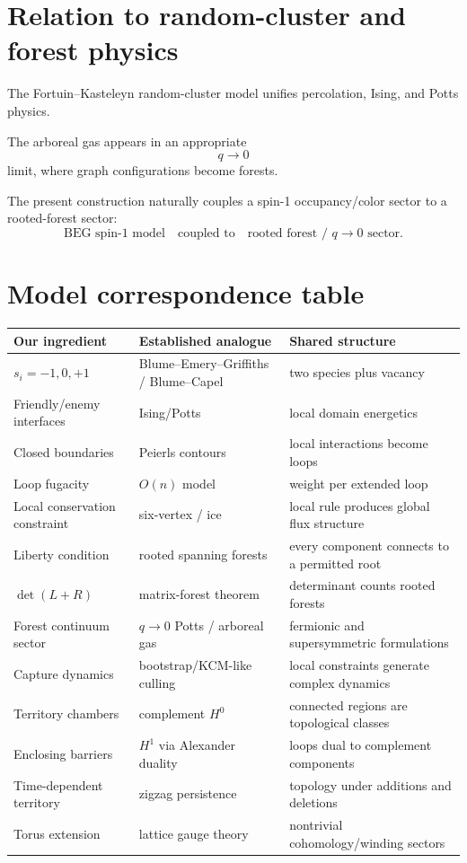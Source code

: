 \documentclass[11pt]{article}
\begin{document}
\section{Relation to random-cluster and forest physics}

The Fortuin--Kasteleyn random-cluster model unifies percolation, Ising, and Potts physics.

The arboreal gas appears in an appropriate
\[
q\rightarrow0
\]
limit, where graph configurations become forests.

The present construction naturally couples a spin-1 occupancy/color sector to a rooted-forest sector:
\[
\boxed{
\text{BEG spin-1 model}
\quad\text{coupled to}\quad
\text{rooted forest / }q\rightarrow0\text{ sector}.
}
\]

\section{Model correspondence table}

\begin{center}
\begin{tabular}{p{}p{}p{}}
\toprule
Our ingredient & Established analogue & Shared structure\\
\midrule
\(s_i=-1,0,+1\) & Blume--Emery--Griffiths / Blume--Capel & two species plus vacancy\\
Friendly/enemy interfaces & Ising/Potts & local domain energetics\\
Closed boundaries & Peierls contours & local interactions become loops\\
Loop fugacity & \(O(n)\) model & weight per extended loop\\
Local conservation constraint & six-vertex / ice & local rule produces global flux structure\\
Liberty condition & rooted spanning forests & every component connects to a permitted root\\
\(\det(L+R)\) & matrix-forest theorem & determinant counts rooted forests\\
Forest continuum sector & \(q\to0\) Potts / arboreal gas & fermionic and supersymmetric formulations\\
Capture dynamics & bootstrap/KCM-like culling & local constraints generate complex dynamics\\
Territory chambers & complement \(H^0\) & connected regions are topological classes\\
Enclosing barriers & \(H^1\) via Alexander duality & loops dual to complement components\\
Time-dependent territory & zigzag persistence & topology under additions and deletions\\
Torus extension & lattice gauge theory & nontrivial cohomology/winding sectors\\
\bottomrule
\end{tabular}
\end{center}
\end{document}
